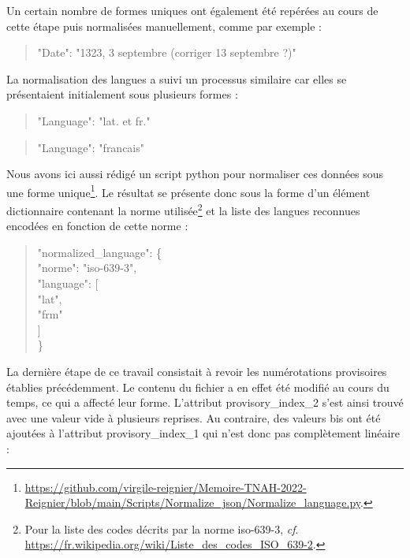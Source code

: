 \documentclass[a4paper,12pt,twoside]{book}
\begin{document}
	\noindent Un certain nombre de formes uniques ont également été repérées au cours de cette étape puis normalisées manuellement, comme par exemple :
	
	\begin{quotation}
		"Date": "1323, 3 septembre (corriger 13 septembre ?)"
	\end{quotation}

	\noindent La normalisation des langues a suivi un processus similaire car elles se présentaient initialement sous plusieurs formes :
	
	\begin{quotation}
		"Language": "lat. et fr."
	\end{quotation}

	\begin{quotation}
		"Language": "francais"
	\end{quotation}
	
	\pagebreak
	
	\noindent Nous avons ici aussi rédigé un script python pour normaliser ces données sous une forme unique\footnote{\url{https://github.com/virgile-reignier/Memoire-TNAH-2022-Reignier/blob/main/Scripts/Normalize_json/Normalize_language.py}.}. Le résultat se présente donc sous la forme d'un élément dictionnaire contenant la norme utilisée\footnote{Pour la liste des codes décrits par la norme iso-639-3, \textit{cf}. \url{https://fr.wikipedia.org/wiki/Liste_des_codes_ISO_639-2}.} et la liste des langues reconnues encodées en fonction de cette norme :
	
	\begin{quotation}
				"normalized\_language": \{\\
			\indent\indent "norme": "iso-639-3",\\
			\indent\indent "language": [\\
			\indent\indent\indent "lat",\\
			\indent\indent\indent "frm"\\
			\indent\indent]\\
			\indent\}
	\end{quotation}
	
	\noindent La dernière étape de ce travail consistait à revoir les numérotations provisoires établies précédemment. Le contenu du fichier a en effet été modifié au cours du temps, ce qui a affecté leur forme. L'attribut \og provisory\_index\_2\fg{} s'est ainsi trouvé avec une valeur vide à plusieurs reprises. Au contraire, des valeurs \og bis\fg{} ont été ajoutées à l'attribut \og provisory\_index\_1\fg{} qui n'est donc pas complètement linéaire :
	
\end{document}
